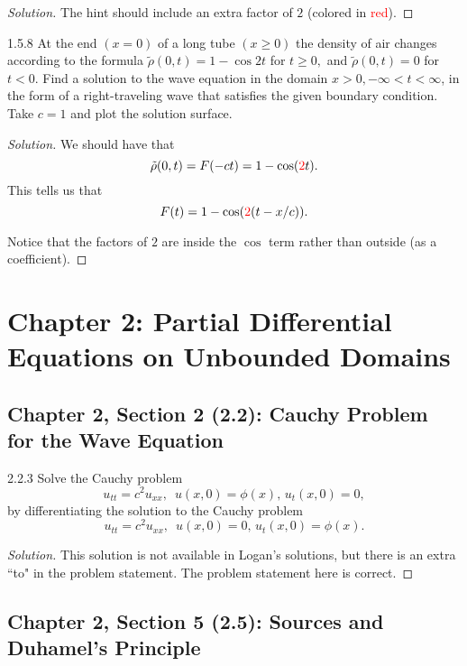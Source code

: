 \documentclass[11pt]{article}
\newenvironment{solution}
  {\renewcommand\qedsymbol{$\blacksquare$}\begin{proof}[Solution]}
  {\end{proof}}
\theoremstyle{definition}
\begin{document}
\begin{solution}
The hint should include an extra factor of $2$ (colored in \textcolor{red}{red}).
\end{solution}

\begin{exercise}{1.5.8}
  At the end $(x = 0)$ of a long tube $(x \geq 0)$ the density of air changes according to the formula $\tilde{\rho}(0,t) = 1 - \cos 2t$ for $t \geq 0,$ 
  and $\tilde{\rho}(0,t) = 0$ for $t < 0$. Find a solution to the wave equation in the domain $x>0, -\infty<t< \infty$, in the form of a 
  right-traveling wave that satisfies the given boundary condition. Take $c = 1$ and plot the solution surface.
\end{exercise}

\begin{solution}
We should have that \[\tilde{\rho}(0,t) = F(-ct) = 1- \cos(\textcolor{red}{2}t).\] This tells us that \[F(t) = 1-\cos(\textcolor{red}{2}(t - x/c)). \]

Notice that the factors of $2$ are inside the $\cos$ term rather than outside (as a coefficient).
\end{solution}

\newpage

\section{Chapter 2: Partial Differential Equations on Unbounded Domains}

\setcounter{subsection}{1}
\subsection{Chapter 2, Section 2 (2.2): Cauchy Problem for the Wave Equation }
\begin{exercise}{2.2.3}
Solve the Cauchy problem
\[ u_{tt} = c^2u_{xx}, \, \, \, u(x, 0)=\phi(x), \, u_t(x, 0) = 0,\]
by differentiating the solution to the Cauchy problem
\[ u_{tt} = c^2u_{xx}, \, \, \, u(x, 0)= 0, \, u_t(x, 0) = \phi(x).\]
\end{exercise}

\begin{solution}
This solution is not available in Logan's solutions, but there is an extra ``to" in the problem statement. The problem statement here is correct.
\end{solution}

\setcounter{subsection}{4}
\subsection{Chapter 2, Section 5 (2.5): Sources and Duhamel's Principle}
\end{document}
